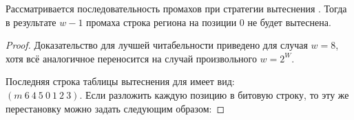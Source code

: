 \begin{lemma}\label{PseudoLRUNolDisplacing}
Рассматривается последовательность промахов при стратегии вытеснения \PseudoLRU. Тогда в результате $w{-}1$ промаха строка региона на позиции 0 не будет вытеснена.
\end{lemma}
\begin{proof}
    Доказательство для лучшей читабельности приведено для случая $w = 8$, хотя всё аналогичное переносится на случай произвольного $w = 2^W$.

    Последняя строка таблицы вытеснения для \PseudoLRU имеет вид:\\$(m~6~4~5~0~1~2~3)$. Если разложить каждую позицию в битовую строку, то эту же перестановку можно задать следующим образом:
\end{proof}
